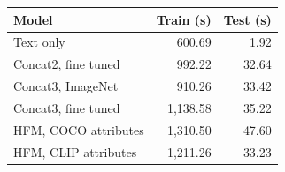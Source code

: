 \begin{tabular}{lrr}
\toprule
Model & Train (s) & Test (s) \\
\midrule
Text only & 600.69 & 1.92 \\
Concat2, fine tuned & 992.22 & 32.64 \\
Concat3, ImageNet & 910.26 & 33.42 \\
Concat3, fine tuned & 1,138.58 & 35.22 \\
HFM, COCO attributes & 1,310.50 & 47.60 \\
HFM, CLIP attributes & 1,211.26 & 33.23 \\
\bottomrule
\end{tabular}
